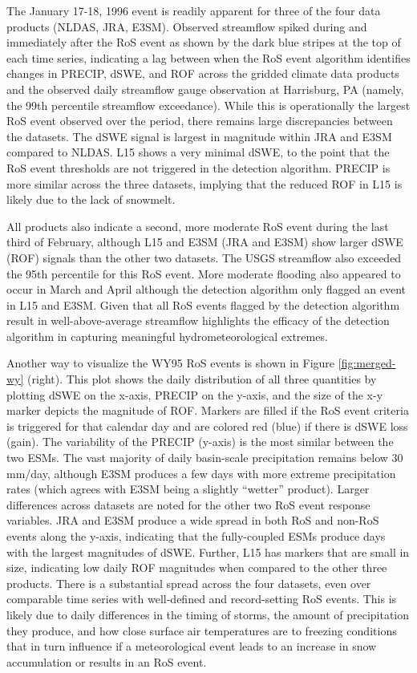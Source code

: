 \documentclass[draft]{agujournal2019}
\begin{document}
The January 17-18, 1996 event is readily apparent for three of the four data products (NLDAS, JRA, E3SM). 
Observed streamflow spiked during and immediately after the RoS event as shown by the dark blue stripes at the top of each time series, indicating a lag between when the RoS event algorithm identifies changes in PRECIP, dSWE, and ROF across the gridded climate data products and the observed daily streamflow gauge observation at Harrisburg, PA (namely, the 99th percentile streamflow exceedance).
While this is operationally the largest RoS event observed over the period, there remains large discrepancies between the datasets. 
The dSWE signal is largest in magnitude within JRA and E3SM compared to NLDAS. 
L15 shows a very minimal dSWE, to the point that the RoS event thresholds are not triggered in the detection algorithm. 
PRECIP is more similar across the three datasets, implying that the reduced ROF in L15 is likely due to the lack of snowmelt.

All products also indicate a second, more moderate RoS event during the last third of February, although L15 and E3SM (JRA and E3SM) show larger dSWE (ROF) signals than the other two datasets. 
The USGS streamflow also exceeded the 95th percentile for this RoS event. 
More moderate flooding also appeared to occur in March and April although the detection algorithm only flagged an event in L15 and E3SM. 
Given that all RoS events flagged by the detection algorithm result in well-above-average streamflow highlights the efficacy of the detection algorithm in capturing meaningful hydrometeorological extremes.

Another way to visualize the WY95 RoS events is shown in Figure \ref{fig:merged-wy} (right).  This plot shows the daily distribution of all three quantities by plotting dSWE on the x-axis, PRECIP on the y-axis, and the size of the x-y marker depicts the magnitude of ROF.
Markers are filled if the RoS event criteria is triggered for that calendar day and are colored red (blue) if there is dSWE loss (gain). 
The variability of the PRECIP (y-axis) is the most similar between the two ESMs.
The vast majority of daily basin-scale precipitation remains below 30 mm/day, although E3SM produces a few days with more extreme precipitation rates (which agrees with E3SM being a slightly ``wetter'' product). 
Larger differences across datasets are noted for the other two RoS event response variables. 
JRA and E3SM produce a wide spread in both RoS and non-RoS events along the y-axis, indicating that the fully-coupled ESMs produce days with the largest magnitudes of dSWE. 
Further, L15 has markers that are small in size, indicating low daily ROF magnitudes when compared to the other three products.
There is a substantial spread across the four datasets, even over comparable time series with well-defined and record-setting RoS events.
This is likely due to daily differences in the timing of storms, the amount of precipitation they produce, and how close surface air temperatures are to freezing conditions that in turn influence if a meteorological event leads to an increase in snow accumulation or results in an RoS event.
\end{document}
